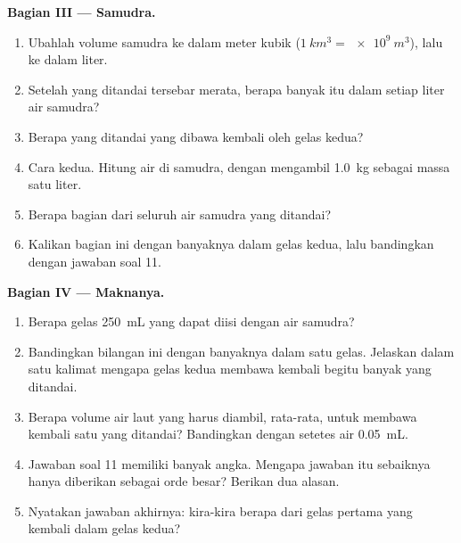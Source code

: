 \begin{problem}
\medskip
\noindent\textbf{Bagian III --- Samudra.}
\begin{enumerate}[resume]
  \item Ubahlah volume samudra ke dalam meter kubik
        ($\qty{1}{km^3} = \qty{e9}{m^3}$), lalu ke dalam liter.
  \item Setelah  yang ditandai tersebar merata, berapa
        banyak  itu dalam setiap liter air samudra?
  \item Berapa  yang ditandai yang dibawa kembali oleh gelas
        kedua?
  \item Cara kedua. Hitung  air di samudra, dengan mengambil
        \qty{1.0}{kg} sebagai massa satu liter.
  \item Berapa bagian dari seluruh  air samudra yang ditandai?
  \item Kalikan bagian ini dengan banyaknya  dalam gelas kedua,
        lalu bandingkan dengan jawaban soal 11.
\end{enumerate}

\medskip
\noindent\textbf{Bagian IV --- Maknanya.}
\begin{enumerate}[resume]
  \item Berapa gelas \qty{250}{mL} yang dapat diisi dengan air
        samudra?
  \item Bandingkan bilangan ini dengan banyaknya  dalam satu
        gelas. Jelaskan dalam satu kalimat mengapa gelas kedua membawa
        kembali begitu banyak  yang ditandai.
  \item Berapa volume air laut yang harus diambil, rata-rata, untuk
        membawa kembali satu  yang ditandai? Bandingkan dengan
        setetes air \qty{0.05}{mL}.
  \item Jawaban soal 11 memiliki banyak angka. Mengapa jawaban itu
        sebaiknya hanya diberikan sebagai orde besar? Berikan dua alasan.
  \item Nyatakan jawaban akhirnya: kira-kira berapa  dari gelas
        pertama yang kembali dalam gelas kedua?
\end{enumerate}
\end{problem}
